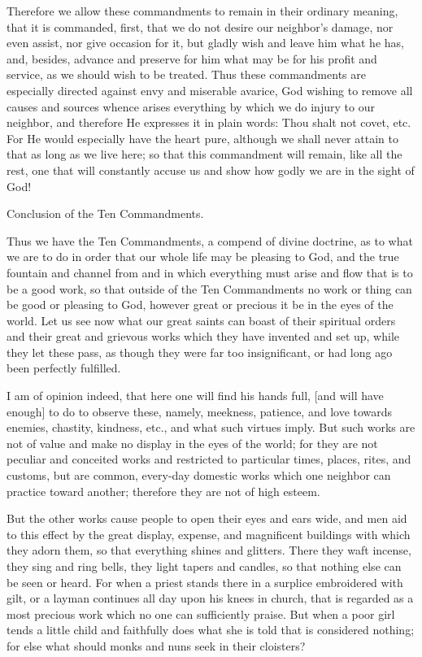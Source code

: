 Therefore we allow these commandments to remain in their ordinary
meaning, that it is commanded, first, that we do not desire our
neighbor's damage, nor even assist, nor give occasion for it, but
gladly wish and leave him what he has, and, besides, advance and
preserve for him what may be for his profit and service, as we should
wish to be treated. Thus these commandments are especially directed
against envy and miserable avarice, God wishing to remove all causes
and sources whence arises everything by which we do injury to our
neighbor, and therefore He expresses it in plain words: Thou shalt not
covet, etc. For He would especially have the heart pure, although we
shall never attain to that as long as we live here; so that this
commandment will remain, like all the rest, one that will constantly
accuse us and show how godly we are in the sight of God!

 Conclusion of the Ten Commandments.

Thus we have the Ten Commandments, a compend of divine doctrine, as to
what we are to do in order that our whole life may be pleasing to God,
and the true fountain and channel from and in which everything must
arise and flow that is to be a good work, so that outside of the Ten
Commandments no work or thing can be good or pleasing to God, however
great or precious it be in the eyes of the world. Let us see now what
our great saints can boast of their spiritual orders and their great
and grievous works which they have invented and set up, while they let
these pass, as though they were far too insignificant, or had long ago
been perfectly fulfilled.

I am of opinion indeed, that here one will find his hands full, [and
will have enough] to do to observe these, namely, meekness, patience,
and love towards enemies, chastity, kindness, etc., and what such
virtues imply. But such works are not of value and make no display in
the eyes of the world; for they are not peculiar and conceited works
and restricted to particular times, places, rites, and customs, but are
common, every-day domestic works which one neighbor can practice toward
another; therefore they are not of high esteem.

But the other works cause people to open their eyes and ears wide, and
men aid to this effect by the great display, expense, and magnificent
buildings with which they adorn them, so that everything shines and
glitters. There they waft incense, they sing and ring bells, they light
tapers and candles, so that nothing else can be seen or heard. For when
a priest stands there in a surplice embroidered with gilt, or a layman
continues all day upon his knees in church, that is regarded as a most
precious work which no one can sufficiently praise. But when a poor
girl tends a little child and faithfully does what she is told that is
considered nothing; for else what should monks and nuns seek in their
cloisters?

